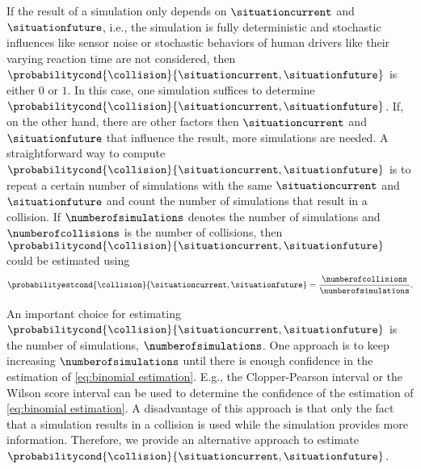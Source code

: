 If the result of a simulation only depends on $\situationcurrent$ and $\situationfuture$, i.e., the simulation is fully deterministic and stochastic influences like sensor noise or stochastic behaviors of human drivers like their varying reaction time are not considered, then $\probabilitycond{\collision}{\situationcurrent, \situationfuture}$ is either $0$ or $1$.
In this case, one simulation suffices to determine $\probabilitycond{\collision}{\situationcurrent, \situationfuture}$.
If, on the other hand, there are other factors then $\situationcurrent$ and $\situationfuture$ that influence the result, more simulations are needed.
A straightforward way to compute $\probabilitycond{\collision}{\situationcurrent, \situationfuture}$ is to repeat a certain number of simulations with the same $\situationcurrent$ and $\situationfuture$ and count the number of simulations that result in a collision.
If $\numberofsimulations$ denotes the number of simulations and $\numberofcollisions$ is the number of collisions, then $\probabilitycond{\collision}{\situationcurrent, \situationfuture}$ could be estimated using
\begin{equation}
	\label{eq:binomial estimation}
	\probabilityestcond{\collision}{\situationcurrent, \situationfuture}
	= \frac{\numberofcollisions}{\numberofsimulations}.
\end{equation}

An important choice for estimating $\probabilitycond{\collision}{\situationcurrent, \situationfuture}$ is the number of simulations, $\numberofsimulations$.
One approach is to keep increasing $\numberofsimulations$ until there is enough confidence in the estimation of \cref{eq:binomial estimation}.
E.g., the Clopper-Pearson interval \autocite{clopper1934use} or the Wilson score interval \autocite{wilson1927probable} can be used to determine the confidence of the estimation of \cref{eq:binomial estimation}.
A disadvantage of this approach is that only the fact that a simulation results in a collision is used while the simulation provides more information. 
Therefore, we provide an alternative approach to estimate $\probabilitycond{\collision}{\situationcurrent, \situationfuture}$.

